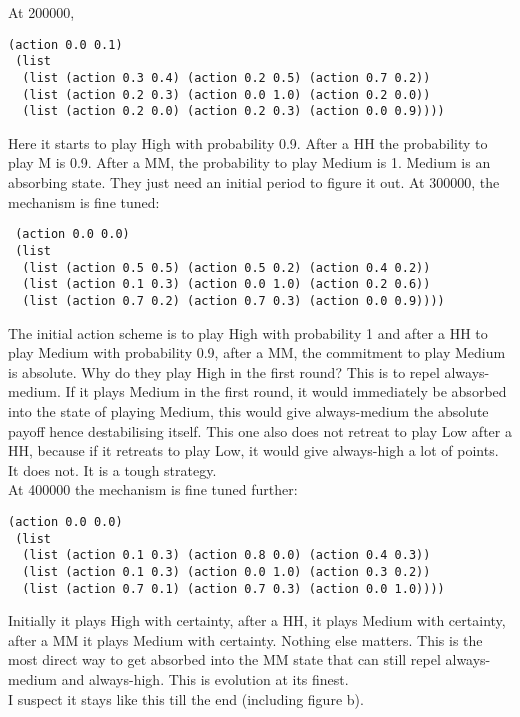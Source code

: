 \documentclass[12.5pt]{report}
\begin{document}
At 200000, 
\begin{verbatim}
(action 0.0 0.1)
 (list
  (list (action 0.3 0.4) (action 0.2 0.5) (action 0.7 0.2))
  (list (action 0.2 0.3) (action 0.0 1.0) (action 0.2 0.0))
  (list (action 0.2 0.0) (action 0.2 0.3) (action 0.0 0.9))))
\end{verbatim}

Here it starts to play High with probability 0.9. After a HH the probability to play M is 0.9. After a MM, the probability to play Medium is 1. Medium is an absorbing state. They just need an initial period to figure it out. At 300000, the mechanism is fine tuned:

\begin{verbatim}
 (action 0.0 0.0)
 (list
  (list (action 0.5 0.5) (action 0.5 0.2) (action 0.4 0.2))
  (list (action 0.1 0.3) (action 0.0 1.0) (action 0.2 0.6))
  (list (action 0.7 0.2) (action 0.7 0.3) (action 0.0 0.9))))
\end{verbatim}

The initial action scheme is to play High with probability 1 and after a HH to play Medium with probability 0.9, after a MM, the commitment to play Medium is absolute. Why do they play High in the first round? This is to repel always-medium. If it plays Medium in the first round, it would immediately be absorbed into the state of playing Medium, this would give always-medium the absolute payoff hence destabilising itself. This one also does not retreat to play Low after a HH, because if it retreats to play Low, it would give always-high a lot of points. It does not. It is a tough strategy.\\

At 400000 the mechanism is fine tuned further:
\begin{verbatim}
(action 0.0 0.0)
 (list
  (list (action 0.1 0.3) (action 0.8 0.0) (action 0.4 0.3))
  (list (action 0.1 0.3) (action 0.0 1.0) (action 0.3 0.2))
  (list (action 0.7 0.1) (action 0.7 0.3) (action 0.0 1.0))))
\end{verbatim}

Initially it plays High with certainty, after a HH, it plays Medium with certainty, after a MM it plays Medium with certainty. Nothing else matters. This is the most direct way to get absorbed into the MM state that can still repel always-medium and always-high. This is evolution at its finest.\\

I suspect it stays like this till the end (including figure b).\\
\end{document}
